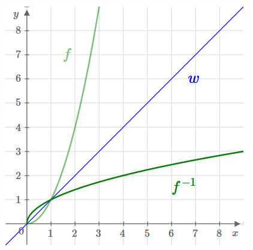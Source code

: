 \begin{multicols}{2}
    \begin{center}
        \includegraphics[scale=0.7]{wurzelfunktion2}
    \end{center}

\end{multicols}
